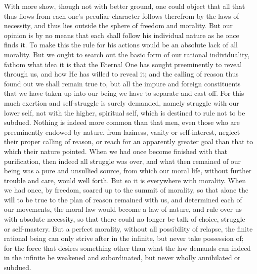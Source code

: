 \documentclass[12pt,a4paper,openany]{book}
\newcommand{\opage}[1]{\marginnote{\footnotesize\textit{[#1]}}}
\begin{document}
With more show, though not with better ground, one could object that all that thus
flows from each one's peculiar character follows therefrom by the laws of necessity,
and thus lies outside the sphere of freedom and morality. But our opinion is by no
means that each shall follow his individual nature as he once finds it. To make this
the rule for his actions would be an absolute lack of all morality. But we ought to
search out the basic form of our rational individuality, fathom what idea it is that
the Eternal One has sought preeminently to reveal through us, and how He has willed
to reveal it; and the calling of reason thus found out we shall remain true to, but
all the impure and foreign constituents that we have taken up into our being we have
to separate and cast off. For this much exertion and self-struggle is surely
demanded, namely struggle with our lower self, not with the higher, spiritual self,
which is destined to rule not to be subdued. Nothing is indeed more common than that
men, even those who are preeminently endowed by nature, from laziness, vanity or
self-interest, neglect their proper calling of reason, or reach for an apparently
greater goal than that to which their nature pointed. When we had once become
finished with that purification, then indeed all struggle was over, and what then
remained of our being was a pure and
\setcounter{footnote}{0}%
\opage{88}unsullied source, from which our moral life, without further trouble and care,
would well forth. But so it is everywhere with morality. When we had once, by
freedom, soared up to the summit of morality, so that alone the will to be true to
the plan of reason remained with us, and determined each of our movements, the moral
law would become a law of nature, and rule over us with absolute necessity, so that
there could no longer be talk of choice, struggle or self-mastery. But a perfect
morality, without all possibility of relapse, the finite rational being can only
strive after in the infinite, but never take possession of; for the force that
desires something other than what the law demands can indeed in the infinite be
weakened and subordinated, but never wholly annihilated or subdued.
\end{document}
